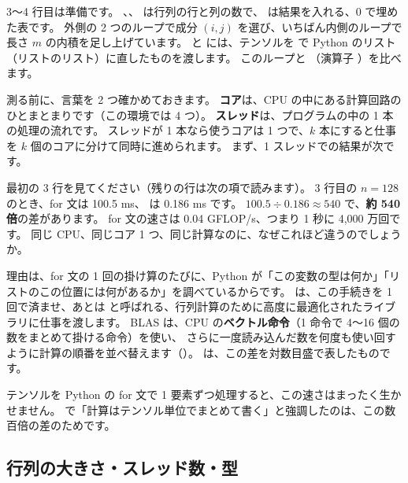 
3〜4 行目は準備です。
、、 は行列の行と列の数で、 は結果を入れる、0 で埋めた表です。
外側の 2 つのループで成分 $(i,j)$ を選び、いちばん内側のループで長さ $m$ の内積を足し上げています。
 と  には、テンソルを  で Python のリスト（リストのリスト）に直したものを渡します。
このループと （演算子 ）を比べます。

測る前に、言葉を 2 つ確かめておきます。
\textbf{コア}は、CPU の中にある計算回路のひとまとまりです（この環境では 4 つ）。
\textbf{スレッド}は、プログラムの中の 1 本の処理の流れです。
スレッドが 1 本なら使うコアは 1 つで、$k$ 本にすると仕事を $k$ 個のコアに分けて同時に進められます。
まず、1 スレッドでの結果が次です。


最初の 3 行を見てください（残りの行は次の項で読みます）。
3 行目の $n=128$ のとき、for 文は 100.5 ms、 は 0.186 ms です。
$100.5\div0.186\approx540$ で、\textbf{約 540 倍}の差があります。
for 文の速さは 0.04 GFLOP/s、つまり 1 秒に 4,000 万回です。
同じ CPU、同じコア 1 つ、同じ計算なのに、なぜこれほど違うのでしょうか。

理由は、for 文の 1 回の掛け算のたびに、Python が「この変数の型は何か」「リストのこの位置には何があるか」を調べているからです。
 は、この手続きを 1 回で済ませ、あとは と呼ばれる、行列計算のために高度に最適化されたライブラリに仕事を渡します。
BLAS は、CPU の\textbf{ベクトル命令}（1 命令で 4〜16 個の数をまとめて掛ける命令）を使い、
さらに一度読み込んだ数を何度も使い回すように計算の順番を並べ替えます（）。
は、この差を対数目盛で表したものです。


テンソルを Python の for 文で 1 要素ずつ処理すると、この速さはまったく生かせません。
で「計算はテンソル単位でまとめて書く」と強調したのは、この数百倍の差のためです。

\subsection*{行列の大きさ・スレッド数・型}

